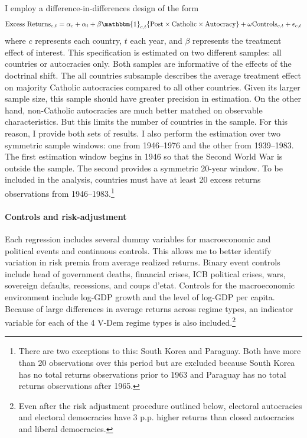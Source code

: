 \documentclass[12pt]{article}
\numberwithin{equation}{section}
\begin{document}
I employ a difference-in-differences design of the form
\begin{multline}
\textrm{Excess Returns}_{c,t} = \alpha_{c}+\alpha_{t} +\beta\mathbbm{1}_{c,t}\{\textrm{Post}\times\textrm{Catholic}\times\textrm{Autocracy}\}  +\mathbf{\omega} \textrm{Controls}_{c,t}+\epsilon_{c,t} \label{eq:singleDiff}
\end{multline}
where $c$ represents each country, $t$ each year, and $\beta$ represents the treatment effect of interest.  This specification is estimated on two different samples: all countries or autocracies only.  Both samples are informative of the effects of the doctrinal shift. The all countries subsample describes the average treatment effect on majority Catholic autocracies compared to all other countries. Given its larger sample size, this sample should have greater precision in estimation.  On the other hand, non-Catholic autocracies are much better matched on observable characteristics. But this limits the number of countries in the sample. For this reason, I provide both sets of results. I also perform the estimation over two symmetric sample windows: one from 1946--1976 and the other from 1939--1983. The first estimation window begins in 1946 so that the Second World War is outside the sample. The second provides a symmetric 20-year window.  To be included in the analysis, countries must have at least 20 excess returns observations from 1946--1983.\footnote{There are two exceptions to this: South Korea and Paraguay. Both have more than 20 observations over this period but are excluded because South Korea has no total returns observations prior to 1963 and Paraguay has no total returns observations after 1965.}

\paragraph{Controls and risk-adjustment}
Each regression includes several dummy variables for macroeconomic and political events and continuous controls. This allows me to better identify variation in risk premia from average realized returns. Binary event controls include head of government deaths, financial crises, ICB political crises, wars, sovereign defaults,  recessions, and coups d'etat.  Controls for the macroeconomic environment include log-GDP growth and the level of log-GDP per capita. Because of large differences in average returns across regime types, an indicator variable for each of the 4 V-Dem regime types is also included.\footnote{Even after the risk adjustment procedure outlined below, electoral autocracies and electoral democracies have 3 p.p. higher returns than closed autocracies and liberal democracies. }
\end{document}
